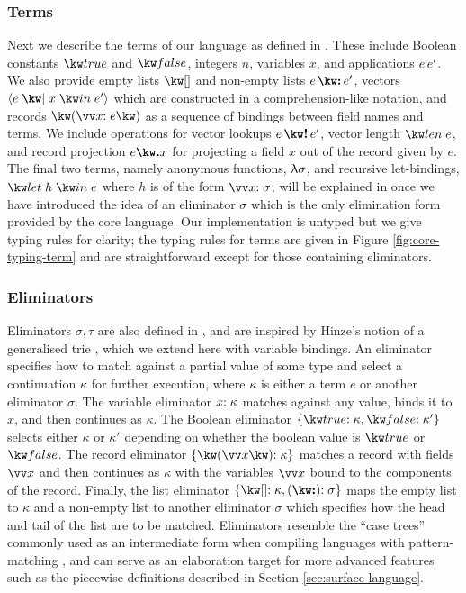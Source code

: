 \subsubsection{Terms}
Next we describe the terms of our language as defined in . These include Boolean constants $\exTrue$ and $\exFalse$, integers $n$, variables $x$, and applications ${e}\,{e'}$. We also provide empty lists $\exNil$ and non-empty lists $\exCons{e}{e'}$, vectors $\exVec{e}{x}{e'}$ which are constructed in a comprehension-like notation, and records $\exRec{\vec{\bind{x}{e}}}$ as a sequence of bindings between field names and terms. We include operations for vector lookups $\exVecLookup{e}{e'}$, vector length $\exVecLen{e}$, and record projection $\exRecProj{e}{x}$ for projecting a field $x$ out of the record given by $e$. The final two terms, namely anonymous functions, $\uplambda{\sigma}$, and recursive let-bindings, $\exLetRecMutual{h}{e}$ where $h$ is of the form $\vec{\bind{x}{\sigma}}$, will be explained in  once we have introduced the idea of an eliminator $\sigma$ which is the only elimination form provided by the core language. Our implementation is untyped but we give typing rules for clarity; the typing rules for terms are given in Figure \ref{fig:core-typing-term} and are straightforward except for those containing eliminators.

\subsubsection{Eliminators}
\label{sec:core-language:syntax-eliminator}
Eliminators $\sigma, \tau$ are also defined in , and are inspired by Hinze's notion of a generalised trie \cite{hinze00}, which we extend here with variable bindings. An eliminator specifies how to match against a partial value of some type and select a continuation $\kappa$ for further execution, where $\kappa$ is either a term $e$ or another eliminator $\sigma$. The variable eliminator ${x}{:}\;{\kappa}$ matches against any value, binds it to $x$, and then continues as $\kappa$. The Boolean eliminator $\elimBool{\kappa}{\kappa'}$ selects either $\kappa$ or $\kappa'$ depending on whether the boolean value is $\exTrue$ or $\exFalse$. The record eliminator $\elimRec{\seq{x}}{\kappa}$ matches a record with fields $\seq{x}$ and then continues as $\kappa$ with the variables $\seq{x}$ bound to the components of the record. Finally, the list eliminator $\elimList{\kappa}{\sigma}$ maps the empty list to $\kappa$ and a non-empty list to another eliminator $\sigma$ which specifies how the head and tail of the list are to be matched. Eliminators resemble the ``case trees'' commonly used as an intermediate form when compiling languages with pattern-matching \cite{graf20}, and can serve as an elaboration target for more advanced features such as the piecewise definitions described in Section \ref{sec:surface-language}.

